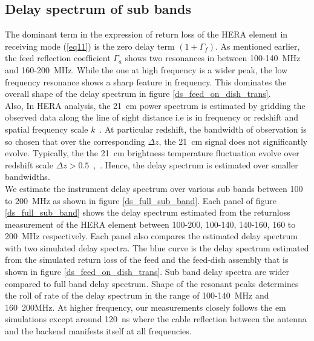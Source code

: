 \documentclass[twocolumn]{emulateapj}
\begin{document}
\subsection{Delay spectrum of sub bands}
The dominant term in the expression of  return loss of the HERA element in receiving mode (\ref{eq11}) is the zero delay term $(1+\Gamma_{f})$. As mentioned earlier, the feed reflection coefficient $\Gamma_{a}$ shows two resonances in between 100-140~MHz and 160-200~MHz. While the one at high frequency is a wider peak, the low frequency resonance shows a sharp feature in frequency. This dominates the overall shape of the delay spectrum in figure \ref{ds_feed_on_dish_trans}.\\
Also, In HERA analysis, the 21~cm power spectrum is estimated by gridding the observed data along the line of sight distance i.e is in frequency or redshift and spatial frequency scale $k$~\citep{liu_et_al2014a}. At particular redshift, the bandwidth of observation is so chosen that over the corresponding $\Delta z$, the 21~cm signal does not significantly evolve. Typically, the the 21~cm brightness temperature fluctuation evolve over redshift scale $\Delta z>0.5$~\citep{loeb_zaldarriaga2004},~\citep{lidz_et_al2008}. Hence, the delay spectrum is estimated over smaller bandwidths.\\ 
We estimate the instrument delay spectrum over various sub bands between 100 to 200~MHz as shown in figure \ref{ds_full_sub_band}. Each panel of figure \ref{ds_full_sub_band} shows the delay spectrum estimated from the returnloss measurement of the HERA element between 100-200, 100-140, 140-160, 160 to 200~MHz respectively. Each panel also compares the estimated delay spectrum with two simulated delay spectra. The blue curve is the delay spectrum estimated from the simulated return loss of the feed and the feed-dish assembly that is shown in figure \ref{ds_feed_on_dish_trans}. Sub band delay spectra are wider compared to full band delay spectrum.  Shape of the resonant peaks determines the roll of rate of the delay spectrum in the range of 100-140~MHz and 160~200MHz. At higher frequency, our measurements closely follows the em simulations except around 120~ns where the cable reflection between the antenna and the backend manifests itself at all frequencies. \\
\end{document}
